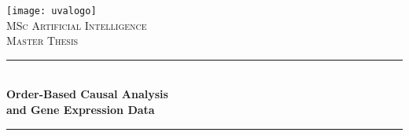 
\begin{titlepage}



    \newcommand{\HRule}{\rule{\linewidth}{0.5mm}} %
    
    \center %
    
     
    
    
    
    
    
    
    \texttt{[image: uvalogo]}\\[2.5cm]
    
    \textsc{\Large MSc Artificial Intelligence}\\[0.2cm]
    
    \textsc{\Large Master Thesis}\\[0.5cm] 
    
    
    
    
    
    
    
    
    \HRule \\[0.4cm]
    
    { \huge \bfseries Order-Based Causal Analysis \\ and Gene Expression Data}\\[0.4cm] %
    
    \HRule \\[0.5cm]
    
     
    
    
    
    

\end{titlepage}
